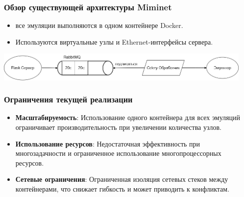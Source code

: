 \documentclass{beamer}
\begin{document}

\begin{frame}[fragile]
  \frametitle{Обзор существующей архитектуры Miminet}
  \begin{itemize}
    \item все эмуляции выполняются в одном контейнере Docker.
    \item Используются виртуальные узлы и Ethernet-интерфейсы сервера.
  \end{itemize}
  \begin{center}
    \includegraphics[width=0.95\textwidth, keepaspectratio]{seq3.png}
  \end{center}

\end{frame}



\begin{frame}[fragile]
  \frametitle{Ограничения текущей реализации}
  \begin{itemize}
    \item \textbf{Масштабируемость}: Использование одного контейнера для всех эмуляций ограничивает производительность при увеличении количества узлов.
    \item \textbf{Использование ресурсов}: Недостаточная эффективность при многозадачности и ограниченное использование многопроцессорных ресурсов.
    \item \textbf{Сетевые ограничения}: Ограниченная изоляция сетевых стеков между контейнерами, что снижает гибкость и может приводить к конфликтам.
  \end{itemize}
\end{frame}
\end{document}
